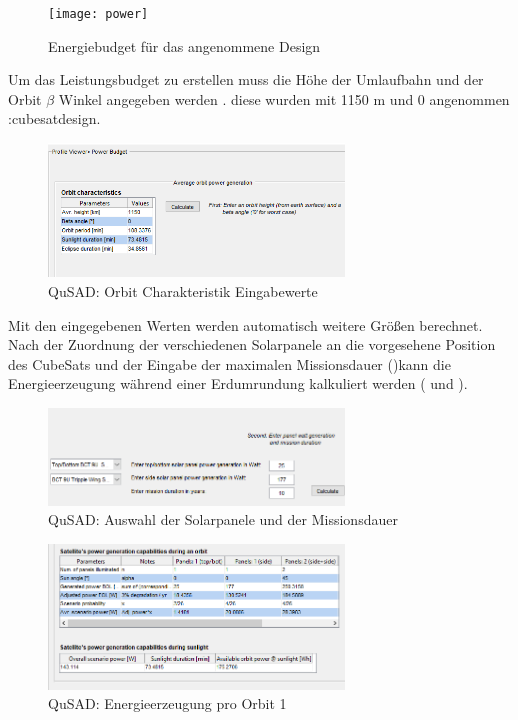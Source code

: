 										\begin{figure}[!h]
											\centering
												\texttt{[image: power]}
											\caption{Energiebudget für das angenommene Design}
											\label{fig:power}
										\end{figure}
Um das Leistungsbudget zu erstellen muss die Höhe der Umlaufbahn und der Orbit $\beta$ Winkel angegeben werden . diese wurden mit 1150 m und 0 \textdegree{} angenommen \tab:{cubesatdesign}.\\
\begin{figure}[!h]
	\centering
		\includegraphics[width=0.70\textwidth]{graphics/power1.png}
	\caption{QuSAD: Orbit Charakteristik Eingabewerte}
	\label{fig:power1}
\end{figure}
Mit den eingegebenen Werten werden automatisch weitere Größen berechnet. Nach der Zuordnung der verschiedenen Solarpanele an die vorgesehene Position des CubeSats und der Eingabe der maximalen Missionsdauer ()kann die Energieerzeugung während einer Erdumrundung kalkuliert werden ( und ).\\										

		 \begin{figure}[!h]
				\centering
					\includegraphics[width=0.70\textwidth]{graphics/power2.PNG}
				\caption{QuSAD: Auswahl der Solarpanele und der Missionsdauer}
				\label{fig:power2}
			\end{figure}
			
			\begin{figure}[!h]
				\centering
					\includegraphics[width=0.70\textwidth]{graphics/power3.png}
				\caption{QuSAD: Energieerzeugung pro Orbit 1}
				\label{fig:power3}
			\end{figure}
			
